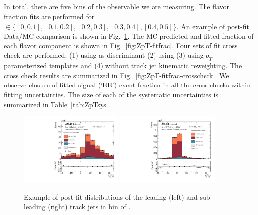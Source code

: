 \clearpage

\subsection{\zpt}

In total, there are five bins of the \zpt observable we are measuring. The flavor fraction fits are performed for \zpt $\in\{[0, 0.1], [0.1, 0.2], [0.2, 0.3], [0.3,0.4], [0.4,0.5]\}$. An example of post-fit Data/MC comparison is shown in Fig.~\ref{fig:ZpT-fit-example}. The MC predicted and fitted fraction of each flavor component is shown in Fig.~\ref{fig:ZpT-fitfrac}. Four sets of fit cross check are performed: (1) using \sdzero as discriminant (2) using \subsubsdzero (3) using $p_T$ parameterized templates and (4) without track jet kinematic reweighting. The cross check results are summarized in Fig.~\ref{fig:ZpT-fitfrac-crosscheck}. We observe closure of fitted signal (`BB') event fraction in all the cross checks within fitting uncertainties. The size of each of the systematic uncertainties is summarized in Table~\ref{tab:ZpTsys}.


\begin{figure}[htbp]
  \centering
 \includegraphics[width=0.45\textwidth]{figures/gbb/paperplots/Canv_Fit_zpt_LpT_INF_SpT_INF_coarse_x}  
 \includegraphics[width=0.45\textwidth]{figures/gbb/paperplots/Canv_Fit_b0_25_zpt_0_3_LpT_INF_SpT_INF_coarse_y}
 \caption{Example of post-fit \subsdzero distributions of the leading (left) and sub-leading (right) track jets in bin of \zpt. }
 \label{fig:ZpT-fit-example}
\end{figure}


